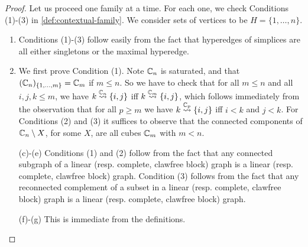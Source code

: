 \begin{proof}
  Let us proceed one family at a time.
  For each one, we check Conditions (1)-(3) in \cref{def:contextual-family}.
  We consider sets of vertices to be $H=\{1,\ldots,n\}$.
  \begin{enumerate}[label=(\alph*)]
    \item Conditions (1)-(3) follow easily from the fact that hyperedges of simplices are all either singletons or the maximal hyperedge.
    \item We first prove Condition (1). 
    Note ${\mathbb C}_n$ is saturated, and that $({\mathbb C}_n)_{\left\{1,\ldots,m\right\}}={\mathbb C}_m$ if $m\leq n$.
    So we have to check that for all $m\leq n$ and all $i,j,k\leq m$, we have $k\stackrel{{{\mathbb C}_n}}{\rightsquigarrow}\left\{i,j\right\}$ iff
    $k\stackrel{{{\mathbb C}_m}}{\rightsquigarrow}\left\{i,j\right\}$, which follows immediately from the observation that for all $p\geq m$ we have
    $k\stackrel{{{\mathbb C}_p}}{\rightsquigarrow}\left\{i,j\right\}$ iff $i<k$ and $j<k$.
    For Conditions (2) and (3) it suffices to observe that the connected components of ${\mathbb C}_n\setminus X$, for some $X$, are all cubes ${\mathbb C}_m$ with $m<n$.
    \item[(c)-(e)] Conditions (1) and (2) follow from the fact that any connected subgraph of a linear (resp. complete, clawfree block) graph is a linear (resp. complete, clawfree block) graph. 
    Condition (3) follows from the fact that any reconnected complement of a subset in a linear (resp. complete, clawfree block) graph is a linear (resp. complete, clawfree block) graph.
    \item[(f)-(g)] This is immediate from the definitions.
  \end{enumerate}
\end{proof}


